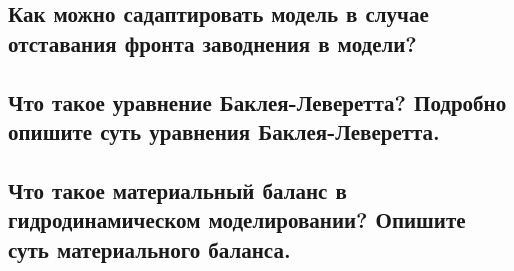 \documentclass[main.tex]{subfiles}
\begin{document}
\newpage

\subsection{Как можно садаптировать модель в случае отставания фронта заводнения в модели?}

\newpage

\subsection{Что такое уравнение Баклея-Леверетта? Подробно опишите суть уравнения Баклея-Леверетта.}

\newpage

\subsection{Что такое материальный баланс в гидродинамическом моделировании? Опишите суть материального баланса.}

\newpage
\end{document}
